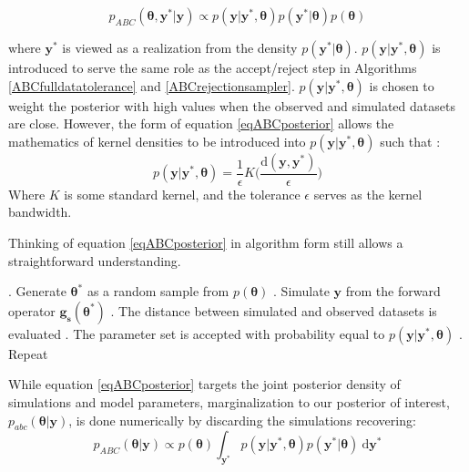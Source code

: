 \begin{equation}
p_{ABC}(\bm{\theta},\bm{y^*}|\bm{y}) \propto p(\bm{y}|\bm{y^*},\bm{\theta}) p(\bm{y^*}|\bm{\theta}) p(\bm{\theta})
\label{eqABCposterior}
\end{equation}

where $\bm{y^*}$ is viewed as a realization from the density $p(\bm{y^*}|\bm{\theta})$. $p(\bm{y}|\bm{y^*},\bm{\theta})$ is introduced to serve the same role as the accept/reject step in Algorithms \ref{ABCfulldatatolerance} and \ref{ABCrejectionsampler}. $p(\bm{y}|\bm{y^*},\bm{\theta})$ is chosen to weight the posterior with high values when the observed and simulated datasets are close. However, the form of equation \ref{eqABCposterior} allows the mathematics of kernel densities to be introduced into $p(\bm{y}|\bm{y^*},\bm{\theta})$ such that \citep{Sisson2010a}:
\begin{equation}
p(\bm{y}|\bm{y^*},\bm{\theta}) = \frac{1}{\epsilon} K \Big(\frac{\text{d}(\bm{y},\bm{y^*})}{\epsilon}\Big)
\label{generic-weighting-kernel}
\end{equation}
Where $K$ is some standard kernel, and the tolerance $\epsilon$ serves as the kernel bandwidth. \par

Thinking of equation \ref{eqABCposterior} in algorithm form still allows a straightforward understanding.
\begin{algorithm}[H]
	\caption{ }
	\begin{algorithmic}
		. Generate $\bm{\theta^*}$ as a random sample from $p(\bm{\theta})$		
		. Simulate $\bm{y}$ from the forward operator $\bm{g_s}(\bm{\theta^*})$		
		. The distance between simulated and observed datasets is evaluated		
		. The parameter set is accepted with probability equal to $p(\bm{y}|\bm{y^*},\bm{\theta})$	
		. Repeat
	\end{algorithmic}
	\label{algorithm-form-equation}
\end{algorithm}

While equation \ref{eqABCposterior} targets the joint posterior density of simulations and model parameters, marginalization to our posterior of interest, $p_{abc}(\bm{\theta}|\bm{y})$, is done numerically by discarding the simulations recovering:
\begin{equation}
p_{ABC}(\bm{\theta}|\bm{y}) \propto p(\bm{\theta}) \int_{\bm{y^*}} p(\bm{y}|\bm{y^*},\bm{\theta}) p(\bm{y^*}|\bm{\theta})\ \text{d}\bm{y^*}
\label{eqABCtargetPosterior}
\end{equation}\par

